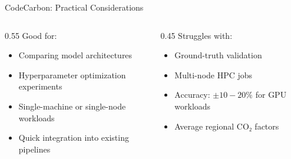 \begin{frame}{CodeCarbon: Practical Considerations}
  \begin{columns}
    \begin{column}{0.55\textwidth}
      Good for:
      \vspace{1em}
      \begin{itemize}
        \setlength{\itemsep}{1.5em}
        \item Comparing model architectures
        \item Hyperparameter optimization experiments
        \item Single-machine or single-node workloads
        \item Quick integration into existing pipelines
      \end{itemize}
    \end{column}
    \begin{column}{0.45\textwidth}
      Struggles with:
      \vspace{1em}
      \begin{itemize}
        \setlength{\itemsep}{1.5em}
        \item Ground-truth validation
        \item Multi-node HPC jobs
        \item Accuracy: $\pm10-20\%$ for GPU workloads
        \item Average regional CO₂ factors
      \end{itemize}
    \end{column}
  \end{columns}
\end{frame}


